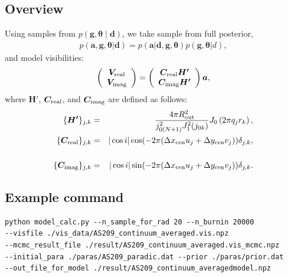 \documentclass{report}
\begin{document}
\subsection{Overview}
Using samples from $p(\bm{g} , \bm{\theta} \mid \bm{d})$, we take sample from full posterior, 
\begin{eqnarray}
  p(\bm{a}, \bm{g} , \bm{\theta} |\bm{d})=p(\bm{a}|\bm{d}, \bm{g} , \bm{\theta}) p(\bm{g} , \bm{\theta} |d), 
\end{eqnarray}
and model visibilities: 
\begin{eqnarray}
\left(\begin{array}{c}
    \bm{V}_{\rm real} \\
    \bm{V}_{\rm imag} 
\end{array}\right)
= 
\left(\begin{array}{cc}
 \bm{C}_{\rm real}\bm{H'} \\
 \bm{C}_{\rm imag}\bm{H'} \\
\end{array}\right)
 \bm{a}, \label{eq:linear_inclined}
\end{eqnarray} 
where $\bm{H'}$, $\bm{C}_{\rm real}$, and $\bm{C}_{\rm imag}$ are defined as follows: 
\begin{eqnarray}
    \{\bm{H'}\}_{j,k} &=&  \displaystyle \frac{4 \pi R_{\rm out}^{2}}{j_{0( N+1)}^{2} J_{1}^{2}(j_{0k})} J_{0} \left(2 \pi q_{j} r_{k} \right),  \\
  \{\bm{C}_{\rm real}\}_{j, k} &=& |\cos i| \cos(-2\pi (\Delta x_{\rm cen} u_{j} + \Delta y_{\rm cen} v_{j})) \delta_{j,k}, \nonumber \\ \\ 
 \{ \bm{C}_{\rm imag}\}_{j, k} &=&  |\cos i| \sin(-2\pi (\Delta x_{\rm cen} u_{j} + \Delta y_{\rm cen} v_{j})) \delta_{j,k}. \nonumber \\ 
\end{eqnarray} 


\subsection{Example command}

\begin{verbatim}
python model_calc.py --n_sample_for_rad 20 --n_burnin 20000
--visfile ./vis_data/AS209_continuum_averaged.vis.npz 
--mcmc_result_file ./result/AS209_continuum_averaged.vis_mcmc.npz
--initial_para ./paras/AS209_paradic.dat --prior ./paras/prior.dat 
--out_file_for_model ./result/AS209_continuum_averagedmodel.npz
\end{verbatim}
\end{document}
